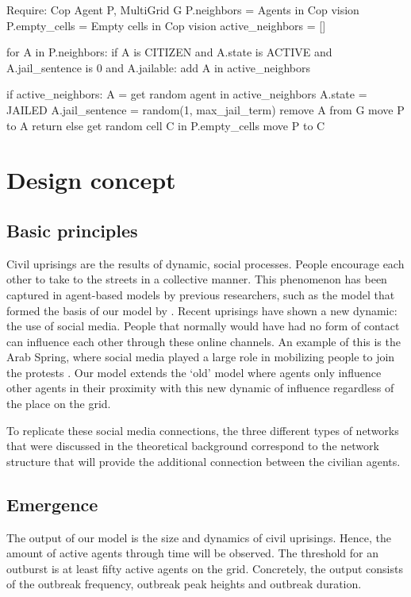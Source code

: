 \documentclass[10pt]{article}
\begin{document}
    \begin{algorithm}[caption = {Role: Cop agent}]
        Require: Cop Agent P, MultiGrid G
        P.neighbors   = Agents in Cop vision
        P.empty_cells = Empty cells in Cop vision
        active_neighbors = []

        for A in P.neighbors:
        if A is CITIZEN and A.state is ACTIVE and A.jail_sentence is 0
        and A.jailable:
        add A in active_neighbors

        if active_neighbors:
        A = get random agent in active_neighbors
        A.state = JAILED
        A.jail_sentence = random(1, max_jail_term)
        remove A from G
        move P to A
        return
        else
        get random cell C in P.empty_cells
        move P to C
    \end{algorithm}

    \section{Design concept}
    \subsection{Basic principles}
    Civil uprisings are the results of dynamic, social processes. People encourage each other to take to the streets in a collective manner. This phenomenon has been captured in agent-based models by previous researchers, such as the model that formed the basis of our model by \cite{epstein2001modeling}. Recent uprisings have shown a new dynamic: the use of social media. People that normally would have had no form of contact can influence each other through these online channels. An example of this is the Arab Spring, where social media played a large role in mobilizing people to join the protests \cite{howard2011opening}. Our model extends the `old' model where agents only influence other agents in their proximity with this new dynamic of influence regardless of the place on the grid.

    To replicate these social media connections, the three different types of networks that were discussed in the theoretical background correspond to the network structure that will provide the additional connection between the civilian agents.

    \subsection{Emergence}
    The output of our model is the size and dynamics of civil uprisings. Hence, the amount of active agents through time will be observed. The threshold for an outburst is at least fifty active agents on the grid. Concretely, the output consists of the outbreak frequency, outbreak peak heights and outbreak duration.
\end{document}
